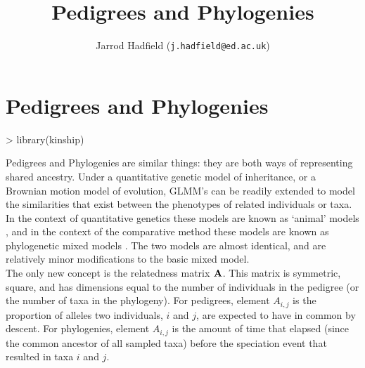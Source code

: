 \documentclass{article}
\title{Pedigrees and Phylogenies}
\author{Jarrod Hadfield (\texttt{j.hadfield@ed.ac.uk})}
\begin{document}
\maketitle
\else
\chapter{Pedigrees and Phylogenies}
\label{chap6}
\fi
\begin{Schunk}
\begin{Sinput}
> library(kinship)
\end{Sinput}
\end{Schunk}



Pedigrees and Phylogenies are similar things: they are both ways of representing shared ancestry. Under a quantitative genetic model of inheritance, or a Brownian motion model of evolution, GLMM's can be readily extended to model the similarities that exist between the phenotypes of related individuals or taxa.  In the context of quantitative genetics these models are known as `animal' models \citep{Henderson.1976}, and in the context of the comparative method these models are known as phylogenetic mixed models \citep{Lynch.1991}. The two models are almost identical, and are relatively minor modifications to the basic mixed model.\\

The only new concept is the relatedness matrix ${\bf A}$. This matrix is symmetric, square, and has dimensions equal to the number of individuals in the pedigree (or the number of taxa in the phylogeny). For pedigrees, element $A_{i,j}$ is the proportion of alleles two individuals, $i$ and $j$, are expected to have in  common by descent. For phylogenies, element $A_{i,j}$ is the amount of time that elapsed (since the common ancestor of all sampled taxa) before the speciation event that resulted in taxa $i$ and $j$. 
\end{document}
